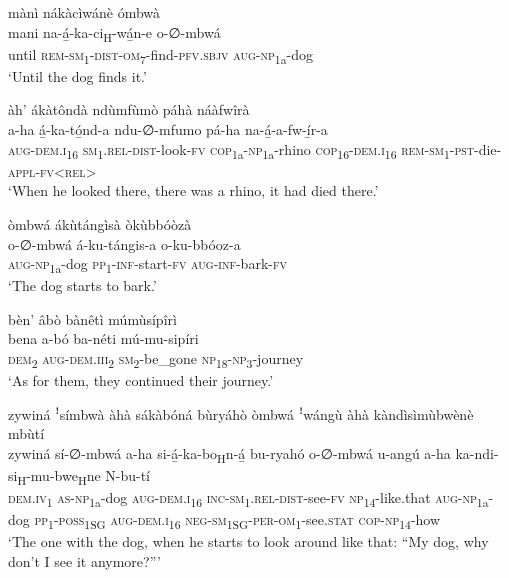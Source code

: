 mànì nákàcìwánè ómbwà\\
\gll mani  na-á̲-ka-ci\textsubscript{H}{}-wá̲n-e        o-∅-mbwá\\
until  \textsc{rem}{}-\textsc{sm}\textsubscript{1}{}-\textsc{dist}{}-\textsc{om}\textsubscript{7}{}-find-\textsc{pfv}.\textsc{sbjv}  \textsc{aug}{}-\textsc{np}\textsubscript{1a}{}-dog\\
\glt ‘Until the dog finds it.’\bigskip

àh’ ákàtôndà ndùmfùmò páhà náàfwîrà\\
\gll a-ha    á̲-ka-tó̲nd-a      ndu-∅-mfumo pá-ha      na-á̲-a-fw-í̲r-a \\
\textsc{aug}{}-\textsc{dem}.\textsc{i}\textsubscript{16}  \textsc{sm}\textsubscript{1}.\textsc{rel}{}-\textsc{dist}{}-look-\textsc{fv}  \textsc{cop}\textsubscript{1a}{}-\textsc{np}\textsubscript{1a}{}-rhino
\textsc{cop}\textsubscript{16}{}-\textsc{dem}.\textsc{i}\textsubscript{16}  \textsc{rem}{}-\textsc{sm}\textsubscript{1}{}-\textsc{pst}{}-die-\textsc{appl}{}-\textsc{fv}<\textsc{rel}>\\
\glt ‘When he looked there, there was a rhino, it had died there.’\bigskip

òmbwá ákùtángìsà òkùbbóòzà\\
\gll o-∅-mbwá    á-ku-tángis-a  o-ku-bbóoz-a\\
\textsc{aug}{}-\textsc{np}\textsubscript{1a}{}-dog  \textsc{pp}\textsubscript{1}{}-\textsc{inf}{}-start-\textsc{fv}  \textsc{aug}{}-\textsc{inf}{}-bark-\textsc{fv}\\
\glt ‘The dog starts to bark.’\bigskip

bèn’ âbò bànêtì múmùsípîrì\\
\gll bena  a-bó    ba-néti  mú-mu-sipíri\\
\textsc{dem}\textsubscript{2}  \textsc{aug}{}-\textsc{dem}.\textsc{iii}\textsubscript{2}  \textsc{sm}\textsubscript{2}{}-be\_gone  \textsc{np}\textsubscript{18}{}-\textsc{np}\textsubscript{3}{}-journey\\
\glt ‘As for them, they continued their journey.’\bigskip

zywiná ꜝsímbwà àhà sákàbóná bùryáhò òmbwá ꜝwángù àhà kàndìsìmùbwènè mbùtí\\
\gll zywiná  sí-∅-mbwá  a-ha    si-á̲-ka-bo\textsubscript{H}n-á̲    bu-ryahó o-∅-mbwá    u-angú  a-ha    ka-ndi-si\textsubscript{H}{}-mu-bwe\textsubscript{H}ne N-bu-tí \\
\textsc{dem}.\textsc{iv}\textsubscript{1}  \textsc{as}{}-\textsc{np}\textsubscript{1a}{}-dog  \textsc{aug}{}-\textsc{dem}.\textsc{i}\textsubscript{16}  \textsc{inc}{}-\textsc{sm}\textsubscript{1}.\textsc{rel}{}-\textsc{dist}{}-see-\textsc{fv}  \textsc{np}\textsubscript{14}{}-like.that
\textsc{aug}{}-\textsc{np}\textsubscript{1a}{}-dog  \textsc{pp}\textsubscript{1}{}-\textsc{poss}\textsubscript{1SG}  \textsc{aug}{}-\textsc{dem}.\textsc{i}\textsubscript{16}  \textsc{neg}{}-\textsc{sm}\textsubscript{1SG}{}-\textsc{per}{}-\textsc{om}\textsubscript{1}{}-see.\textsc{stat}
\textsc{cop}{}-\textsc{np}\textsubscript{14}{}-how\\
\glt ‘The one with the dog, when he starts to look around like that: “My dog, why don’t I see it anymore?”’\bigskip

